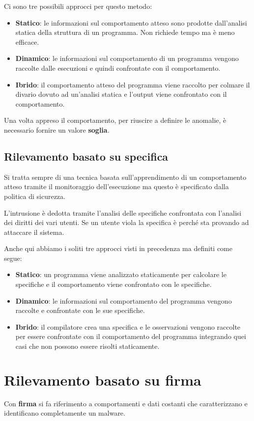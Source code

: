 Ci sono tre possibili approcci per questo metodo:
\begin{itemize}
	\item \textbf{Statico}: le informazioni sul comportamento atteso sono prodotte dall'analisi statica della struttura
	      di un programma. Non richiede tempo ma è meno efficace.
	\item \textbf{Dinamico}: le informazioni sul comportamento di un programma vengono raccolte dalle esecuzioni e
	      quindi confrontate con il comportamento.
	\item \textbf{Ibrido}: il comportamento atteso del programma viene raccolto per colmare il divario dovuto ad
	      un'analisi statica e l'output viene confrontato con il comportamento.
\end{itemize}
Una volta appreso il comportamento, per riuscire a definire le anomalie, è necessario fornire un valore \textbf{soglia}.

\subsection{Rilevamento basato su specifica}
Si tratta sempre di una tecnica basata sull'apprendimento di un comportamento atteso tramite il monitoraggio
dell'esecuzione ma questo è specificato dalla politica di sicurezza.

L'intrusione è dedotta tramite l'analisi delle specifiche confrontata con l'analisi dei diritti dei vari utenti. Se
un utente viola la specifica è perché sta provando ad attaccare il sistema.

Anche qui abbiamo i soliti tre approcci visti in precedenza ma definiti come segue:
\begin{itemize}
	\item \textbf{Statico}: un programma viene analizzato staticamente per calcolare le specifiche e il comportamento
	      viene confrontato con le specifiche.
	\item \textbf{Dinamico}: le informazioni sul comportamento del programma vengono raccolte e confrontate con le sue
	      specifiche.
	\item \textbf{Ibrido}: il compilatore crea una specifica e le osservazioni vengono raccolte per essere confrontate
	      con il comportamento del programma integrando quei casi che non possono essere risolti staticamente.
\end{itemize}

\section{Rilevamento basato su firma}
Con \textbf{firma} si fa riferimento a comportamenti e dati costanti che caratterizzano e identificano completamente
un malware.

